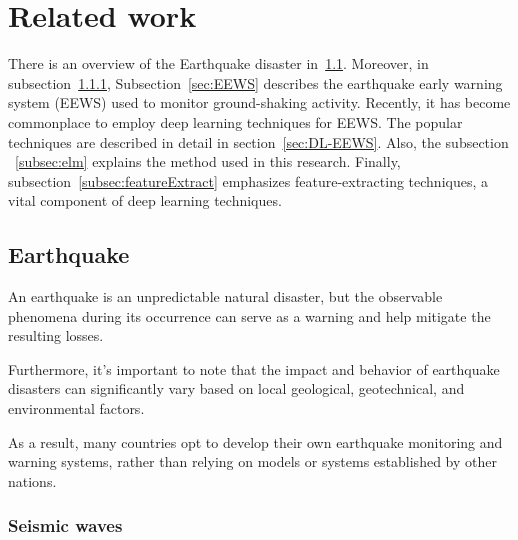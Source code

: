 \chapter{Related work}\label{Chap:relatedwork}

There is an overview of the Earthquake disaster in~\ref{sec:Earth}. Moreover, in subsection~\ref{subsec:seismic},  Subsection~\ref{sec:EEWS} describes the earthquake early warning system (EEWS) used to monitor ground-shaking activity. Recently, it has become commonplace to employ deep learning techniques for EEWS. The popular techniques are described in detail in section~\ref{sec:DL-EEWS}. Also, the subsection ~\ref{subsec:elm} explains the method used in this research. Finally, subsection~\ref{subsec:featureExtract} emphasizes feature-extracting techniques, a vital component of deep learning techniques.  

\section{Earthquake}\label{sec:Earth}
An earthquake is an unpredictable natural disaster, but the observable phenomena during its occurrence can serve as a warning and help mitigate the resulting losses. 

Furthermore, it's important to note that the impact and behavior of earthquake disasters can significantly vary based on local geological, geotechnical, and environmental factors. 

As a result, many countries opt to develop their own earthquake monitoring and warning systems, rather than relying on models or systems established by other nations.
\subsection{Seismic waves} \label{subsec:seismic}


